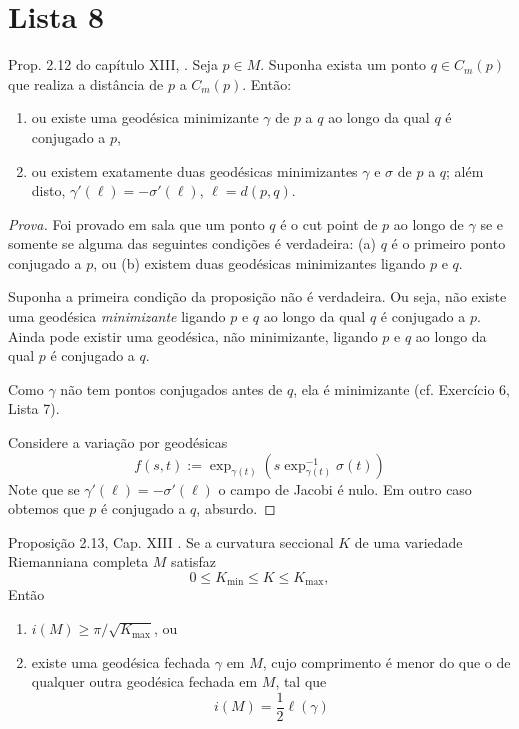\begin{exercise}

\end{exercise}

\section{Lista 8}
\label{section-l8}

\begin{exercise}
Prop. 2.12 do capítulo XIII, \cite{doc}. Seja $p \in M$. 
Suponha exista um ponto $q \in C_m(p)$ que realiza a distância de $p$ a 
$C_m(p)$. Então:
\begin{enumerate}
\item ou existe uma geodésica 
minimizante $\gamma$ de $p$ a $q$ ao longo da qual $q$ é 
conjugado a $p$,
\item ou existem exatamente duas geodésicas 
minimizantes $\gamma$ e $\sigma$ de $p$ a $q$; além disto,
$\gamma'(\ell)=-\sigma'(\ell)$, 
$\ell=d(p,q)$. 
\end{enumerate}
\end{exercise}

\begin{proof}[Prova]
Foi provado em sala que um ponto $q$ é o cut point de $p$ ao longo 
de $\gamma$ se e somente se
alguma das seguintes condições é verdadeira: (a) $q$ é o primeiro ponto
conjugado a $p$, ou (b) existem duas geodésicas minimizantes ligando $p$ e $q$.

Suponha a primeira condição da proposição não é verdadeira. 
Ou seja, não existe uma geodésica {\it minimizante} ligando $p$ e $q$ ao longo
da qual $q$ é conjugado a $p$. Ainda pode existir uma geodésica, não
minimizante, ligando $p$ e $q$ ao longo da qual $p$ é conjugado a $q$.

Como $\gamma$ não tem pontos conjugados antes
de $q$, ela é minimizante (cf. Exercício 6, Lista 7).

Considere a variação por geodésicas 
$$
f(s,t):=\operatorname{exp}_{\gamma(t)}
(s\operatorname{exp}_{\gamma(t)}^{-1}\sigma(t))
$$
Note que se $\gamma'(\ell)=-\sigma'(\ell)$ o campo de Jacobi é nulo. Em outro
caso obtemos que $p$ é conjugado a $q$, absurdo.
\end{proof}

\begin{exercise}
Proposição 2.13, Cap. XIII \cite{doc}. Se a curvatura seccional $K$ de uma
variedade Riemanniana completa $M$ satisfaz
$$
0\leq K_{\operatorname{min}}\leq K\leq K_{\operatorname{max}},
$$
Então
\begin{enumerate}
\item $i(M) \geq \pi/\sqrt{K_{\operatorname{max}}}$, ou
\item existe uma geodésica fechada $\gamma$ em $M$, cujo comprimento é menor do 
que o de qualquer outra geodésica fechada em $M$, tal que
$$
i(M)=\frac{1}{2}\ell(\gamma)
$$

\end{enumerate}
\end{exercise}


